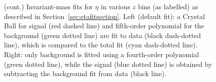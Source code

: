 \begin{figure}[H]  
 \centering 
\label{fig:etazfit}
\caption[Invariant-mass fits for $\eta$ in various $z$ bins (cont.)]{(cont.) Invariant-mass fits for $\eta$ in various $z$ bins (as labelled) as described in Section~\ref{sec:etafitsection}. Left (default fit):  a Crystal Ball for signal (red dashed line) and fifth-order polynomial for the background (green dotted line) are fit to data (black dash-dotted line), which is compared to the total fit  (cyan dash-dotted line). Right: only background is fitted using a fourth-order polynomial (green dotted line), while the signal (blue dotted line) is obtained by subtracting the background fit from data (black line).}
\end{figure}

